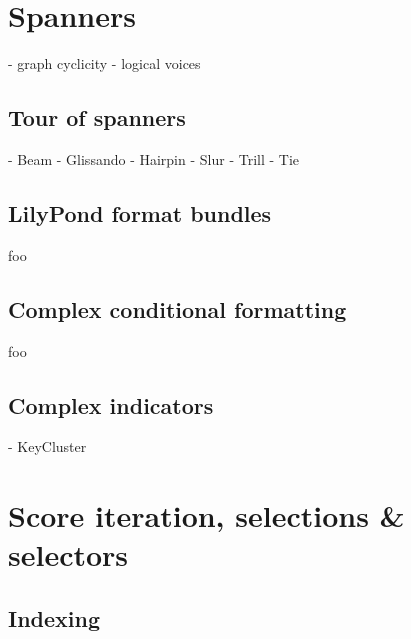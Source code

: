 \section{Spanners}

\begin{markdown}
-   graph cyclicity
-   logical voices
\end{markdown}

\subsection{Tour of spanners}

\begin{markdown}
-   Beam
-   Glissando
-   Hairpin
-   Slur
-   Trill
-   Tie
\end{markdown}

\subsection{LilyPond format bundles}

foo

\subsection{Complex conditional formatting}

foo

\subsection{Complex indicators}

\begin{markdown}
-   KeyCluster
\end{markdown}

\section{Score iteration, selections \& selectors}

\subsection{Indexing}
\label{ssec:indexing}

